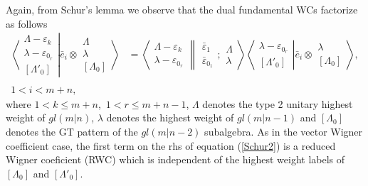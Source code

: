 \documentclass[12pt]{article}
\def\nn{\nonumber}
\begin{document}
Again, from Schur's lemma we observe that the dual fundamental WCs factorize as follows
\begin{align}
\left\langle\left. 
\begin{array}{c} \Lambda-\varepsilon_k\\ \lambda-\varepsilon_{0_r} \\ {[\Lambda'_0]} \end{array}
\right|\right.
\left.
\bar{e}_i\otimes \begin{array}{c} \Lambda \\ \lambda \\
{[\Lambda_0]} \end{array}
\right\rangle &= 
\left\langle 
\begin{array}{c} \Lambda-\varepsilon_k\\ \lambda-\varepsilon_{0_r} 
 \end{array}
\right\rVert
\left.
\begin{array}{c} \bar{\varepsilon}_1 \\ \bar{\varepsilon}_{0_1} 
 \end{array}
; \begin{array}{c} \Lambda \\ \lambda
 \end{array}
\right\rangle 
\left\langle\left. 
\begin{array}{c} \lambda-\varepsilon_{0_r} \\ {[\Lambda'_0]} \end{array}
\right|\right.
\left.
\bar{e}_i\otimes \begin{array}{c} \lambda \\
{[\Lambda_0]} \end{array}
\right\rangle,\label{Schur2}\\
~~\nn\\
1 < i < m+n, \nn
\end{align}
where $1 < k \leq m+n$,~$1 < r \leq m+n-1$, 
$\Lambda$ denotes the type 2 unitary highest weight of $gl(m|n)$, $\lambda$ denotes the highest weight of $gl(m|n-1)$ and $[\Lambda_0]$ denotes the GT pattern of the $gl(m|n-2)$ subalgebra. As in the vector Wigner coefficient case, the first term on the rhs of equation (\ref{Schur2}) is a reduced Wigner coeficient (RWC) which is independent of the highest
weight labels of $[\Lambda_0]$ and $[\Lambda'_0]$.
\end{document}
